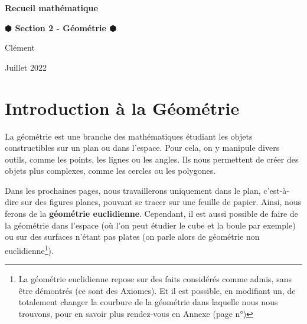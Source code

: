 \documentclass[a4paper, twoside]{article}
\begin{document}
\begin{titlepage}
	\begin{center}

		\Huge	 \textbf{Recueil mathématique}\\
		\bigskip \smallskip

		\Large	 \textbf{$\varhexagonblack$ Section 2 - Géométrie $\varhexagonblack$}\\
		\bigskip

		\large	 Clément   \\
		\smallskip

		\normalfont	Juillet 2022 \\

	\end{center}

	\doublespacing
	\tableofcontents
	\singlespacing

\end{titlepage}






\section{Introduction à la Géométrie}

La géométrie est une branche des mathématiques étudiant les objets constructibles sur un plan ou dans l'espace.
Pour cela, on y manipule divers outils, comme les points, les lignes ou les angles.
Ils nous permettent de créer des objets plus complexes, comme les cercles ou les polygones.

\medbreak

Dans les prochaines pages, nous travaillerons uniquement dans le plan, c'est-à-dire sur des figures planes,
pouvant se tracer sur une feuille de papier. Ainsi, nous ferons de la \textbf{géométrie euclidienne}.
Cependant, il est aussi possible de faire de la géométrie dans l'espace
(où l'on peut étudier le cube et la boule par exemple) ou sur des surfaces n'étant pas plates
(on parle alors de géométrie non euclidienne\footnote{La géométrie euclidienne
	repose sur des faits considérés comme admis, sans être démontrés (ce sont des Axiomes).
	Et il est possible, en modifiant un, de totalement changer la courbure de la géométrie
	dans laquelle nous nous trouvons, pour en savoir plus rendez-vous en Annexe (page n°\pageref{geo_non_euclidienne}) }).
\end{document}
